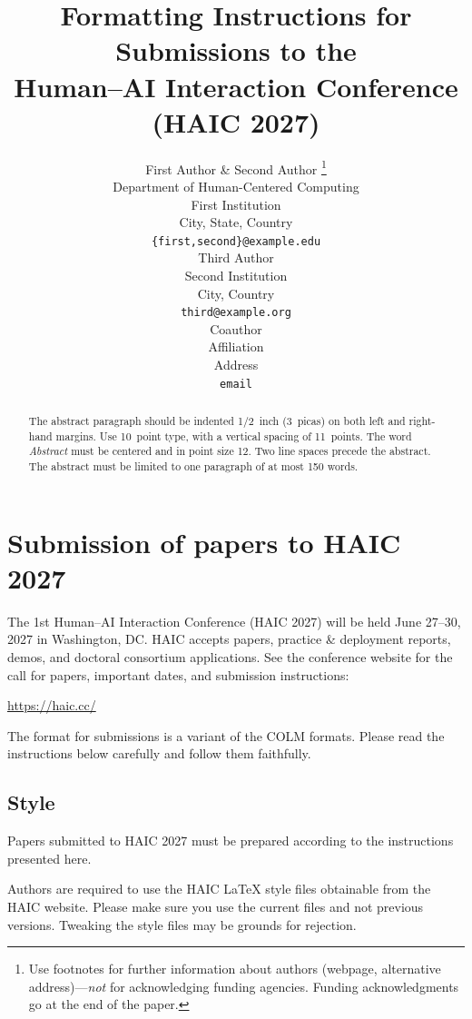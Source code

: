 \documentclass{article} %
\title{Formatting Instructions for Submissions to the \\ Human--AI Interaction Conference (HAIC 2027)}
\author{First Author \& Second Author \thanks{Use footnotes for further
information about authors (webpage, alternative address)---\emph{not} for
acknowledging funding agencies. Funding acknowledgments go at the end of the
paper.} \\
Department of Human-Centered Computing\\
First Institution\\
City, State, Country \\
\texttt{\{first,second\}@example.edu} \\
\And
Third Author \\
Second Institution \\
City, Country \\
\texttt{third@example.org} \\
\AND
Coauthor \\
Affiliation \\
Address \\
\texttt{email}
}
\begin{document}
\ifhaicsubmission
\linenumbers
\fi

\maketitle

\begin{abstract}
The abstract paragraph should be indented 1/2~inch (3~picas) on both left and
right-hand margins. Use 10~point type, with a vertical spacing of 11~points.
The word \textit{Abstract} must be centered and in point size 12. Two
line spaces precede the abstract. The abstract must be limited to one
paragraph of at most 150 words.
\end{abstract}

\section{Submission of papers to HAIC 2027}

The 1st Human--AI Interaction Conference (HAIC 2027) will be held June
27--30, 2027 in Washington, DC. HAIC accepts papers, practice \& deployment
reports, demos, and doctoral consortium applications. See the conference
website for the call for papers, important dates, and submission
instructions:
\begin{center}
   \url{https://haic.cc/}
\end{center}
The format for submissions is a variant of the COLM formats. Please read the instructions below carefully and follow them
faithfully.

\subsection{Style}

Papers submitted to HAIC 2027 must be prepared according to the
instructions presented here.


Authors are required to use the HAIC \LaTeX{} style files obtainable from the
HAIC website. Please make sure you use the current files and
not previous versions. Tweaking the style files may be grounds for rejection.
\end{document}
